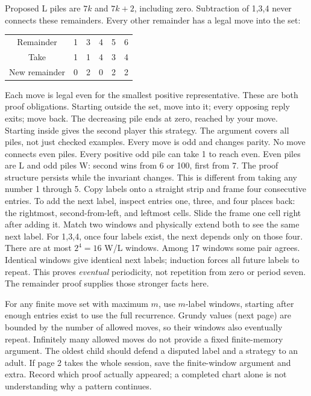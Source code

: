 \documentclass[11pt]{article}
\begin{document}
\newpage
{}
Proposed L piles are \(7k\) and \(7k+2\), including zero. Subtraction of 1,3,4 never connects these remainders. Every other remainder has a legal move into the set:
\begin{center}\renewcommand{\arraystretch}{1.45}\begin{tabular}{c|ccccc}Remainder&1&3&4&5&6\\Take&1&1&4&3&4\\New remainder&0&2&0&2&2\end{tabular}\end{center}
Each move is legal even for the smallest positive representative. These are both proof obligations. Starting outside the set, move into it; every opposing reply exits; move back. The decreasing pile ends at zero, reached by your move. Starting inside gives the second player this strategy. The argument covers all piles, not just checked examples.
Every move is odd and changes parity. No move connects even piles. Every positive odd pile can take 1 to reach even. Even piles are L and odd piles W: second wins from 6 or 100, first from 7. The proof structure persists while the invariant changes. This is different from taking any number 1 through 5.
Copy labels onto a straight strip and frame four consecutive entries. To add the next label, inspect entries one, three, and four places back: the rightmost, second-from-left, and leftmost cells. Slide the frame one cell right after adding it. Match two windows and physically extend both to see the same next label. For 1,3,4, once four labels exist, the next depends only on those four. There are at most \(2^4=16\) W/L windows. Among 17 windows some pair agrees. Identical windows give identical next labels; induction forces all future labels to repeat. This proves \emph{eventual} periodicity, not repetition from zero or period seven. The remainder proof supplies those stronger facts here.

For any finite move set with maximum \(m\), use \(m\)-label windows, starting after enough entries exist to use the full recurrence. Grundy values (next page) are bounded by the number of allowed moves, so their windows also eventually repeat. Infinitely many allowed moves do not provide a fixed finite-memory argument.
The oldest child should defend a disputed label and a strategy to an adult. If page 2 takes the whole session, save the finite-window argument and extra. Record which proof actually appeared; a completed chart alone is not understanding why a pattern continues.
\end{document}
